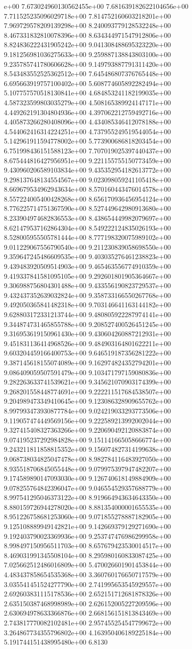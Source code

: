 e+00	7.673024960130562455e+00	7.681639182622104656e+00	7.711525235096029718e+00	7.814752160603218201e+00	7.969729578209139298e+00	8.240093779128532248e+00	8.467331832810078396e+00	8.634344971547912806e+00	8.824836222431905242e+00	9.041308488695323220e+00	9.181256981036275633e+00	9.259887138843803100e+00	9.235785741780606628e+00	9.149793887791311420e+00	8.543483552525362512e+00	7.645486807376765448e+00	6.695663919757100402e+00	5.608774605892282494e+00	5.107757570518130841e+00	4.684853241182199035e+00	4.587323599803035279e+00	4.508165389924147171e+00	4.449262191304804936e+00	4.397062212759492716e+00	4.405873266280408096e+00	4.434085346412078188e+00	4.544062416314224251e+00	4.737955249519544054e+00	5.142961911594778002e+00	5.773900686818203454e+00	6.751998436151588123e+00	7.707019025397440437e+00	8.675444816427956951e+00	9.221155755150773459e+00	9.430960206589103834e+00	9.435352954182613772e+00	9.298137648134554567e+00	9.023098059241105418e+00	8.669679534962943634e+00	8.570160443476014578e+00	8.557224005400428268e+00	8.656170936456954124e+00	8.776225714751367590e+00	8.527449642980913680e+00	8.233904974682836553e+00	8.438654449982079697e+00	8.621479537162864304e+00	8.549222124835026193e+00	8.528005955505781444e+00	8.777198320075989102e+00	9.011229067556790540e+00	9.211230839058698550e+00	9.359647245486609535e+00	9.403035276461238823e+00	9.439483920509514903e+00	9.465463556774910359e+00	9.419337841581095105e+00	9.292601801905364667e+00	9.306988756804301488e+00	9.433556190823729537e+00	9.432437352639032824e+00	9.358733166550267768e+00	9.492050365841482318e+00	9.703146641163144182e+00	9.628803172331213744e+00	9.480805922287974141e+00	9.344874731465855788e+00	9.208527400526451245e+00	9.316953619150961430e+00	9.430604260887212931e+00	9.451831136414968526e+00	9.484903164801622211e+00	9.603204459166400753e+00	9.646519187356281222e+00	9.387145618155074089e+00	9.162974824352794201e+00	9.086409059507591479e+00	9.103471797159080836e+00	9.282263633741539621e+00	9.345621070903174399e+00	9.268201558448774691e+00	9.222211517684538507e+00	9.204989473349410645e+00	9.123086328909655762e+00	8.997993473930877784e+00	9.024219033293773506e+00	9.119057474449569156e+00	9.222589213992002044e+00	9.327415408327363266e+00	9.220690492120883874e+00	9.074195237292984828e+00	9.151141665058666774e+00	9.243211811858815352e+00	9.156074827314199638e+00	9.068738034825047478e+00	8.982784116483927050e+00	8.935518706845055448e+00	9.079975397947482207e+00	9.174589890147093030e+00	9.126740618149884909e+00	9.078255764842396047e+00	9.046554529357688779e+00	8.997541295046373122e+00	8.919664943634643350e+00	8.880159726944278020e+00	8.881354000001655535e+00	8.951226758681253060e+00	9.071855278887182905e+00	9.125108889949142821e+00	9.142669379129271690e+00	9.192403790023369936e+00	9.253747476986299958e+00	8.998497150956511703e+00	8.657679423530014517e+00	8.469031991345508104e+00	8.295980160833087425e+00	7.025662512486016809e+00	5.470026601901453844e+00	4.483437858654535368e+00	3.360760176650717579e+00	3.035541451524277790e+00	2.741995653545929557e+00	2.692603831115178536e+00	2.652151712681878326e+00	2.635150387468998989e+00	2.626152005227209596e+00	2.630694978633366876e+00	2.668156151813843469e+00	2.743817770082102481e+00	2.957455254547799672e+00	3.264867734355796802e+00	4.163950406189225184e+00	5.191744151438995480e+00	6.8130
